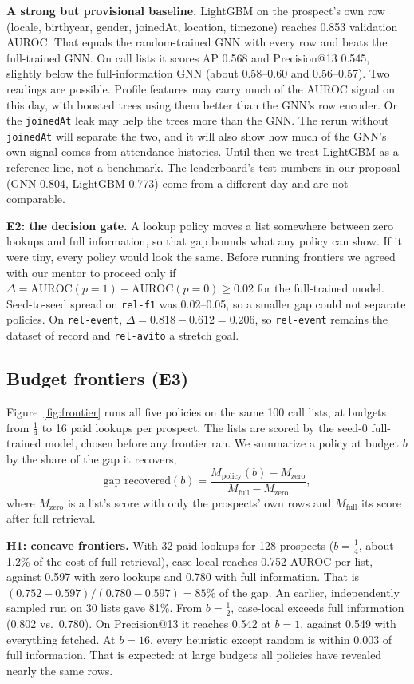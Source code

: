 \documentclass{article}
\begin{document}
\textbf{A strong but provisional baseline.} LightGBM on the prospect's own row (locale, birthyear, gender, joinedAt, location, timezone) reaches 0.853 validation AUROC. That equals the random-trained GNN with every row and beats the full-trained GNN. On call lists it scores AP 0.568 and Precision@13 0.545, slightly below the full-information GNN (about 0.58--0.60 and 0.56--0.57). Two readings are possible. Profile features may carry much of the AUROC signal on this day, with boosted trees using them better than the GNN's row encoder. Or the \texttt{joinedAt} leak may help the trees more than the GNN. The rerun without \texttt{joinedAt} will separate the two, and it will also show how much of the GNN's own signal comes from attendance histories. Until then we treat LightGBM as a reference line, not a benchmark. The leaderboard's test numbers in our proposal (GNN 0.804, LightGBM 0.773) come from a different day and are not comparable.

\textbf{E2: the decision gate.} A lookup policy moves a list somewhere between zero lookups and full information, so that gap bounds what any policy can show. If it were tiny, every policy would look the same. Before running frontiers we agreed with our mentor to proceed only if $\Delta = \text{AUROC}(p{=}1) - \text{AUROC}(p{=}0) \geq 0.02$ for the full-trained model. Seed-to-seed spread on \texttt{rel-f1} was 0.02--0.05, so a smaller gap could not separate policies. On \texttt{rel-event}, $\Delta = 0.818 - 0.612 = 0.206$, so \texttt{rel-event} remains the dataset of record and \texttt{rel-avito} a stretch goal.

\subsection{Budget frontiers (E3)}
\label{sec:e3}
Figure~\ref{fig:frontier} runs all five policies on the same 100 call lists, at budgets from $\frac14$ to 16 paid lookups per prospect. The lists are scored by the seed-0 full-trained model, chosen before any frontier ran. We summarize a policy at budget $b$ by the share of the gap it recovers,
\begin{equation}
  \text{gap recovered}(b) = \frac{M_{\text{policy}}(b) - M_{\text{zero}}}{M_{\text{full}} - M_{\text{zero}}},
  \label{eq:gap}
\end{equation}
where $M_{\text{zero}}$ is a list's score with only the prospects' own rows and $M_{\text{full}}$ its score after full retrieval.

\textbf{H1: concave frontiers.} With 32 paid lookups for 128 prospects ($b = \frac14$, about 1.2\% of the cost of full retrieval), case-local reaches 0.752 AUROC per list, against 0.597 with zero lookups and 0.780 with full information. That is $(0.752 - 0.597)/(0.780 - 0.597) = 85\%$ of the gap. An earlier, independently sampled run on 30 lists gave 81\%. From $b = \frac12$, case-local exceeds full information (0.802 vs.\ 0.780). On Precision@13 it reaches 0.542 at $b = 1$, against 0.549 with everything fetched. At $b = 16$, every heuristic except random is within 0.003 of full information. That is expected: at large budgets all policies have revealed nearly the same rows.
\end{document}
